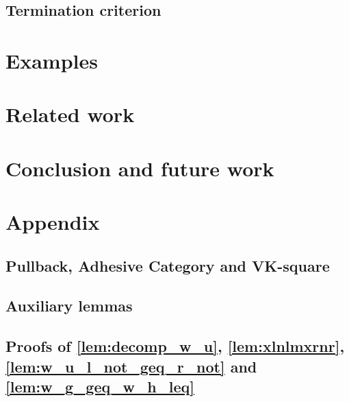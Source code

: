 \documentclass{report}
\begin{document}
\subsection{Termination criterion}
\label{sec:termination} 

 

\section{Examples}
\label{sec:examples}


  
\section{Related work}
\label{sec:related_work} 


\section{Conclusion and future work}
\label{sec:conclusion} 


\section{Appendix}
\subsection{Pullback, Adhesive Category and VK-square}

\subsection{Auxiliary lemmas}

\subsection{Proofs of \autoref{lem:decomp_w_u}, \autoref{lem:xlnlmxrnr}, \autoref{lem:w_u_l_not_geq_r_not} and \autoref{lem:w_g_geq_w_h_leq}}
\label{sec:appendix:a}


% 
% 
\end{document}
